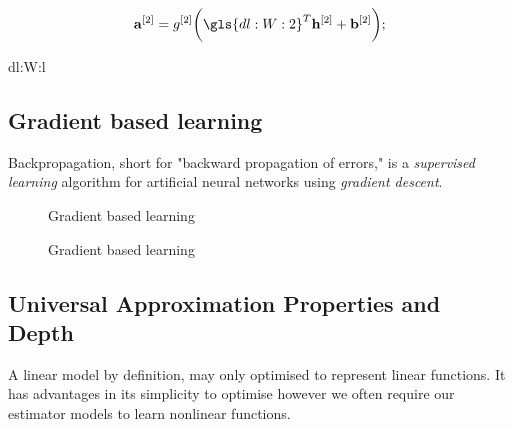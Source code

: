 \begin{equation}
    \mathbf{a}^{[2]} = g^{[2]} \bigg(\gls{dl:W:2}^T\mathbf{h}^{[2]} + \mathbf{b}^{[2]}\bigg);
\end{equation}

\gls{dl:W:l}

\subsection{Gradient based learning}

Backpropagation, short for "backward propagation of errors," is a
\textit{supervised learning} algorithm for artificial neural networks using
\textit{gradient descent}.

\begin{figure}[htp]
    \centering
    
    \caption{Gradient based learning}
    \label{fig:gradient-descent}
\end{figure}


\begin{figure}[htp]
    \centering
    
    \caption{Gradient based learning}
    \label{fig:gradient-descent}
\end{figure}

\subsection{Universal Approximation Properties and Depth}

A linear model by definition, may only optimised to represent linear functions.
It has advantages in its simplicity to optimise however we often require our
estimator models to learn nonlinear functions.



